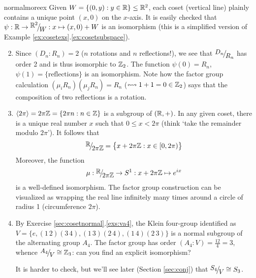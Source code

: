 \begin{examples}{}{normalmoreex}
	\exstart Given $W=\{(0,y):y\in\mathbb{R}\}\le \mathbb{R}^2$, each coset (vertical line) plainly contains a unique point $(x,0)$ on the $x$-axis. It is easily checked that $\psi:\R\to\quotient{\R^2}W:x\mapsto (x,0)+W$ is an isomorphism (this is a simplified version of Example \ref*{ex:cosetexs}.\ref{ex:cosetsubspace}).
	

	\begin{enumerate}\setcounter{enumi}{1}
	  \item Since $(D_n:R_n)=2$ ($n$ rotations and $n$ reflections!), we see that $\quotient{D_n}{R_n}$ has order 2 and is thus isomorphic to $\mathbb{Z}_2$. The function $\psi(0)=R_n$, $\psi(1)=\{\text{reflections}\}$ is an isomorphism. Note how the factor group calculation $(\mu_iR_n)(\mu_jR_n)=R_n$ ($\leftrightsquigarrow 1+1=0\in\mathbb{Z}_2$) says that the composition of two reflections is a rotation.
	  
	  \item $\left\langle 2\pi\right\rangle=2\pi\mathbb{Z}=\{2\pi n:n\in\mathbb{Z}\}$ is a subgroup of $(\mathbb{R},+)$. In any given coset, there is a unique real number $x$ such that $0\le x<2\pi$ (think `take the remainder modulo $2\pi$'). It follows that
	  \[
	  	\quotient{\R}{2\pi\Z}=\bigl\{x+2\pi\Z:x\in[0,2\pi)\bigr\}
	  \]
	  Moreover, the function
	  \[
	  	\mu:\quotient\R{2\pi\Z}\to S^1:x+2\pi\Z\mapsto e^{ix}
	  \]
	  is a well-defined isomorphism. The factor group construction can be visualized as wrapping the real line infinitely many times around a circle of radius 1 (circumference $2\pi$).
	  
	  \item\label{ex:a4normal} By Exercise \ref*{sec:cosetnormal}.\ref{exs:va4}, the Klein four-group identified as $V=\bigl\{
				e,(1\,2)(3\,4),(1\,3)(2\,4),(1\,4)(2\,3)
			\bigr\}$
	  is a normal subgroup of the alternating group $A_4$. The factor group has order $(A_4:V)=\frac{12}4=3$, whence $\quotient{A_4}{V}\cong\Z_3$: can you find an explicit isomorphism?\par
	  It is harder to check, but we'll see later (Section \ref{sec:conj}) that $\quotient{S_4}{V}\cong S_3$.
	  

\end{enumerate}
\end{examples}
